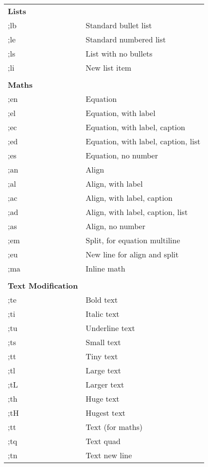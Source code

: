 \documentclass{article}
\begin{document}
\begin{figure}[H]
	\centering
	\begin{minipage}{0.48\textwidth}
		\begin{table}[H]
			\centering
			\begin{tabular}{l l}
				\textbf{Lists } 	\\
				;lb	& Standard bullet list  \\
				;le	& Standard numbered list \\
				;ls	& List with no bullets \\
				;li	& New list item \\
				&  \\
				\textbf{Maths} 	&  \\
				;en	& Equation \\
				;el	& Equation, with label \\
				;ec	& Equation, with label, caption \\
				;ed	& Equation, with label, caption, list \\
				;es	& Equation, no number \\
				;an	& Align \\
				;al	& Align, with label \\
				;ac	& Align, with label, caption \\
				;ad	& Align, with label, caption, list \\
				;as	& Align, no number \\
				;em	& Split, for equation multiline \\
				;eu	& New line for align and split \\
				;ma	& Inline math \\
				&  \\
				\textbf{Text Modification} 	&  \\
				;te	& Bold text  \\
				;ti	& Italic text \\
				;tu	& Underline text \\
				;ts	& Small text \\
				;tt	& Tiny text  \\
				;tl	& Large text \\
				;tL	& Larger text \\
				;th	& Huge text \\
				;tH	& Hugest text \\
				;tt	& Text (for maths) \\
				;tq	& Text quad \\
				;tn	& Text new line \\

\end{tabular}
\end{table}
\end{minipage}
\end{figure}
\end{document}
